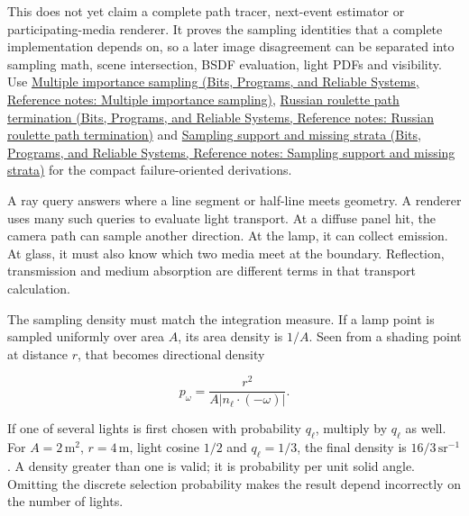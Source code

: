 This does not yet claim a complete path tracer, next-event estimator or participating-media renderer. It proves the sampling identities that a complete implementation depends on, so a later image disagreement can be separated into sampling math, scene intersection, BSDF evaluation, light PDFs and visibility. Use \href{../01-Bits-Programs-and-Reliable-Systems/main.pdf\#nameddest=appendix-ca8898faf1a6}{Multiple importance sampling (Bits, Programs, and Reliable Systems, Reference notes: Multiple importance sampling)}, \href{../01-Bits-Programs-and-Reliable-Systems/main.pdf\#nameddest=appendix-7277c62d4599}{Russian roulette path termination (Bits, Programs, and Reliable Systems, Reference notes: Russian roulette path termination)} and \href{../01-Bits-Programs-and-Reliable-Systems/main.pdf\#nameddest=appendix-10308c3d753e}{Sampling support and missing strata (Bits, Programs, and Reliable Systems, Reference notes: Sampling support and missing strata)} for the compact failure-oriented derivations.

A ray query answers where a line segment or half-line meets geometry. A renderer uses many such queries to evaluate light transport. At a diffuse panel hit, the camera path can sample another direction. At the lamp, it can collect emission. At glass, it must also know which two media meet at the boundary. Reflection, transmission and medium absorption are different terms in that transport calculation.

The sampling density must match the integration measure. If a lamp point is sampled uniformly over area \(A\), its area density is \(1/A\). Seen from a shading point at distance \(r\), that becomes directional density

\[
p_\omega=\frac{r^2}{A\lvert n_\ell\cdot(-\omega)\rvert}.
\]

If one of several lights is first chosen with probability \(q_\ell\), multiply by \(q_\ell\) as well. For \(A=2\,\mathrm{m^2}\), \(r=4\,\mathrm m\), light cosine \(1/2\) and \(q_\ell=1/3\), the final density is \(16/3\,\mathrm{sr}^{-1}\). A density greater than one is valid; it is probability per unit solid angle. Omitting the discrete selection probability makes the result depend incorrectly on the number of lights.

